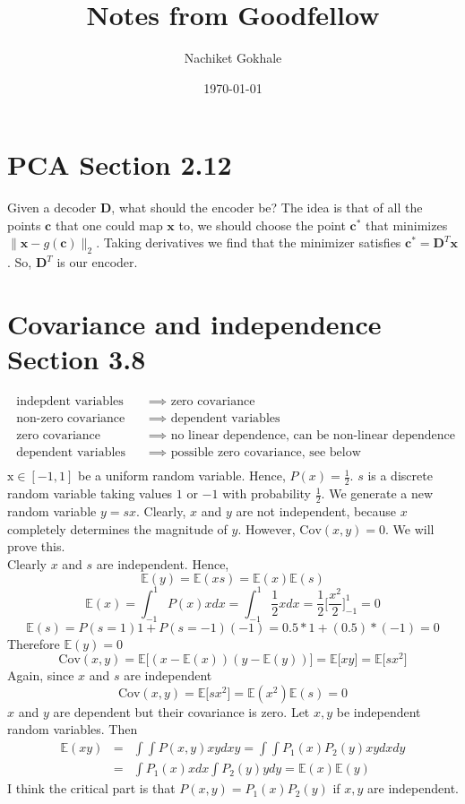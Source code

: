 \documentclass{article}
\newcommand{\beq}{\begin{equation}}
\newcommand{\eeq}{\end{equation}}
\newcommand{\ber}{\begin{eqnarray}}
\newcommand{\eer}{\end{eqnarray}}
\begin{document}
\title{Notes from Goodfellow}
\author{Nachiket Gokhale}
\date{\today}
\maketitle
\section{PCA Section 2.12}
Given a decoder $\pmb{D}$, what should the encoder be? The idea is that of all the points $\pmb{c}$ that one could map $\pmb{x}$ to, we should choose the point $\pmb{c}^*$ that minimizes $\|\pmb{x}-g(\pmb{c})\|_2$. Taking derivatives we find that the minimizer satisfies $\pmb{c}^* = \pmb{D}^T\pmb{x}$. So, $\pmb{D}^T$ is our encoder.
\section{Covariance and independence Section 3.8}
\ber
\text{ indepdent variables } & & \implies \text{ zero covariance }\\
\text{ non-zero covariance } & & \implies \text{ dependent variables }\\
\text{ zero covariance }     & & \implies \text{ no linear dependence, can be non-linear dependence }\\
\text{ dependent variables } & & \implies \text{ possible zero covariance, see below}\\
\eer
$\mathrm{x} \in [-1,1]$ be a uniform random variable. Hence, $P(x)=\frac{1}{2}$. $s$ is a discrete random variable taking values $1$ or $-1$ with probability $\frac{1}{2}$. We generate a new random variable $y=sx$. Clearly, $x$ and $y$ are not independent, because $x$ completely determines the magnitude of $y$. However, $\text{Cov}(x,y)=0$. We will prove this. \\
Clearly $x$ and $s$ are independent. Hence,
\beq
\mathbb{E}(y) = \mathbb{E}(xs) = \mathbb{E}(x)\mathbb{E}(s)
\eeq
\beq
\mathbb{E}(x) = \int_{-1}^{1}P(x)xdx = \int_{-1}^{1}\frac{1}{2}xdx = \frac{1}{2}\Big[\frac{x^2}{2}\Big]_{-1}^{1} = 0
\eeq
\beq
\mathbb{E}(s) = P(s=1)1 + P(s=-1)(-1) = 0.5*1+(0.5)*(-1) = 0
\eeq
Therefore $\mathbb{E}(y)=0$
\beq
\text{Cov}(x,y) = \mathbb{E}\Big[(x-\mathbb{E}(x))(y-\mathbb{E}(y))\Big] = \mathbb{E}\Big[xy\Big] = \mathbb{E}\Big[sx^2\Big]
\eeq
Again, since $x$ and $s$ are independent
\beq
\text{Cov}(x,y) = \mathbb{E}\Big[sx^2\Big] =  \mathbb{E}(x^2)\mathbb{E}(s)=0
\eeq
$x$ and $y$ are dependent but their covariance is zero.
Let $x,y$ be independent random variables. Then
\ber
\mathbb{E}(xy) &=& \int \int P(x,y)xy dxy = \int\int P_1(x)P_2(y) xy dxdy \\
               &=& \int P_1(x)xdx \int P_2(y)ydy = \mathbb{E}(x)\mathbb{E}(y)
\eer
I think the critical part is that $P(x,y)=P_1(x)P_2(y)$ if $x,y$ are independent.
\end{document}
